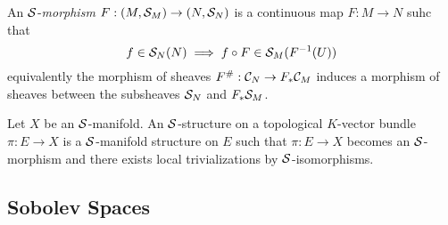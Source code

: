 \documentclass[12pt]{article}
\begin{document}
\begin{defn}
An $\mathcal{S}$-\textit{morphism} $F : (M, \mathcal{S}_M) \to (N, \mathcal{S}_N)$ is a continuous map $F : M \to N$ suhc that
\[ f \in \mathcal{S}_N(N) \implies f \circ F \in \mathcal{S}_M(F^{-1}(U)) \]
equivalently the morphism of sheaves $F^{\#} : \mathcal{C}_N \to F_* \mathcal{C}_M$ induces a morphism of sheaves between the subsheaves $\mathcal{S}_N$ and $F_* \mathcal{S}_M$.
\end{defn}

\begin{defn}
Let $X$ be an $\mathcal{S}$-manifold.
An $\mathcal{S}$-structure on a topological $K$-vector bundle $\pi : E \to X$ is a $\mathcal{S}$-manifold structure on $E$ such that $\pi : E \to X$ becomes an $\mathcal{S}$-morphism and there exists local trivializations by $\mathcal{S}$-isomorphisms. 
\end{defn}

\subsection{Sobolev Spaces}
\end{document}
